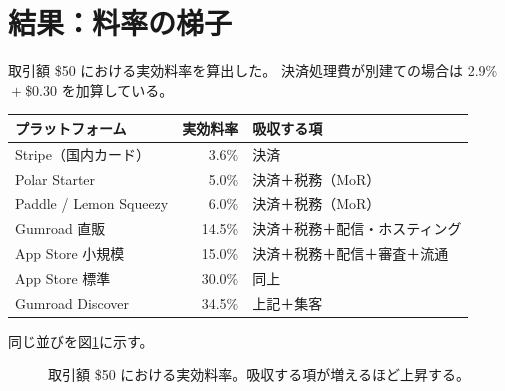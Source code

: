 \section{結果：料率の梯子}

取引額 \$50 における実効料率を算出した。
決済処理費が別建ての場合は 2.9\%${}+{}$\$0.30 を加算している。

\begin{center}
\begin{tabularx}{\textwidth}{@{}lrX@{}}
\toprule
プラットフォーム & 実効料率 & 吸収する項 \\
\midrule
Stripe（国内カード） & 3.6\% & 決済 \\
Polar Starter & 5.0\% & 決済＋税務（MoR） \\
Paddle / Lemon Squeezy & 6.0\% & 決済＋税務（MoR） \\
Gumroad 直販 & 14.5\% & 決済＋税務＋配信・ホスティング \\
App Store 小規模 & 15.0\% & 決済＋税務＋配信＋審査＋流通 \\
App Store 標準 & 30.0\% & 同上 \\
Gumroad Discover & 34.5\% & 上記＋集客 \\
\bottomrule
\end{tabularx}
\label{tab:fee-ladder}
\end{center}

同じ並びを図\ref{fig:platform-ladder}に示す。

\begin{figure}[htbp]
\centering
{}
\caption{取引額 \$50 における実効料率。吸収する項が増えるほど上昇する。}
\label{fig:platform-ladder}
\end{figure}

